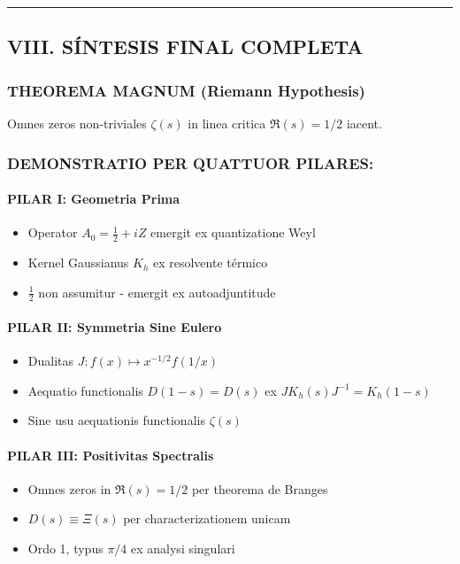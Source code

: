 \hrule
\vspace{1em}

\subsection{VIII. S\'INTESIS FINAL COMPLETA}

\subsubsection*{THEOREMA MAGNUM (Riemann Hypothesis)}

\begin{theorem}\label{thm:riemann-main}
Omnes zeros non-triviales $\zeta(s)$ in linea critica $\Re(s) = 1/2$ iacent.
\end{theorem}

\subsubsection*{DEMONSTRATIO PER QUATTUOR PILARES:}

\paragraph{PILAR I: Geometria Prima}
\begin{itemize}
\item Operator $A_0 = \frac{1}{2} + iZ$ emergit ex quantizatione Weyl
\item Kernel Gaussianus $K_h$ ex resolvente t\'ermico
\item $\frac{1}{2}$ non assumitur - emergit ex autoadjuntitude
\end{itemize}

\paragraph{PILAR II: Symmetria Sine Eulero}
\begin{itemize}
\item Dualitas $J: f(x) \mapsto x^{-1/2} f(1/x)$
\item Aequatio functionalis $D(1-s) = D(s)$ ex $J K_h(s) J^{-1} = K_h(1-s)$
\item Sine usu aequationis functionalis $\zeta(s)$
\end{itemize}

\paragraph{PILAR III: Positivitas Spectralis}
\begin{itemize}
\item Omnes zeros in $\Re(s) = 1/2$ per theorema de Branges
\item $D(s) \equiv \Xi(s)$ per characterizationem unicam
\item Ordo 1, typus $\pi/4$ ex analysi singulari
\end{itemize}

